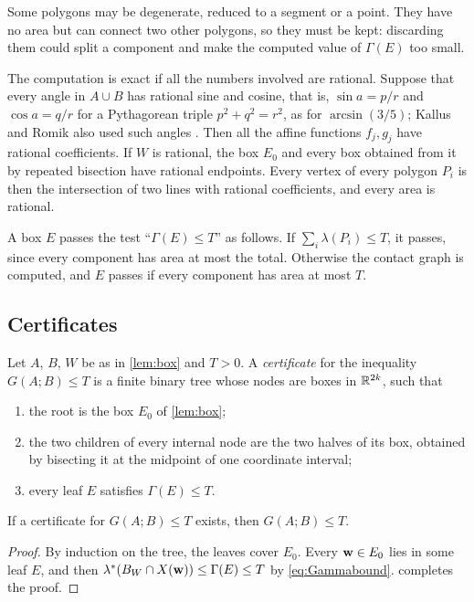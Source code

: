 Some polygons may be degenerate, reduced to a segment or a point. They have no area but can connect two other polygons, so they must be kept: discarding them could split a component and make the computed value of $\Gamma(E)$ too small.

The computation is exact if all the numbers involved are rational. Suppose that every angle in $A\cup B$ has rational sine and cosine, that is, $\sin a=p/r$ and $\cos a=q/r$ for a Pythagorean triple $p^2+q^2=r^2$, as for $\arcsin(3/5)$; Kallus and Romik also used such angles \cite[Section~4 and Appendix]{kallusromik2018}. Then all the affine functions $f_j,g_j$ have rational coefficients. If $W$ is rational, the box $E_0$ and every box obtained from it by repeated bisection have rational endpoints. Every vertex of every polygon $P_i$ is then the intersection of two lines with rational coefficients, and every area is rational.

A box $E$ passes the test ``$\Gamma(E)\le T$'' as follows. If $\sum_i\lambda(P_i)\le T$, it passes, since every component has area at most the total. Otherwise the contact graph is computed, and $E$ passes if every component has area at most $T$.

\subsection{Certificates}

\begin{defn}\label{def:certificate}
Let $A$, $B$, $W$ be as in \cref{lem:box} and $T>0$. A \emph{certificate} for the inequality $G(A;B)\le T$ is a finite binary tree whose nodes are boxes in $\mathbb{R}^{2k}$, such that
\begin{enumerate}[label=(\alph*)]
\item the root is the box $E_0$ of \cref{lem:box};
\item the two children of every internal node are the two halves of its box, obtained by bisecting it at the midpoint of one coordinate interval;
\item every leaf $E$ satisfies $\Gamma(E)\le T$.
\end{enumerate}
\end{defn}

\begin{prop}\label{prop:certificate}
If a certificate for $G(A;B)\le T$ exists, then $G(A;B)\le T$.
\end{prop}

\begin{proof}
By induction on the tree, the leaves cover $E_0$. Every $\mathbf{w}\in E_0$ lies in some leaf $E$, and then $\lambda^{*}(B_W\cap X(\mathbf{w}))\le\Gamma(E)\le T$ by \eqref{eq:Gammabound}.  completes the proof.
\end{proof}

